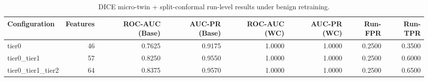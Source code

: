 \begin{table}[t]
\centering
\caption{DICE micro-twin + split-conformal run-level results under benign retraining.}
\label{tab:dice_full_overall}
\footnotesize
\begin{tabular}{lrrrrrrr}
\toprule
Configuration & Features & ROC-AUC (Base) & AUC-PR (Base) & ROC-AUC (WC) & AUC-PR (WC) & Run-FPR & Run-TPR \\
\midrule
tier0 & 46 & 0.7625 & 0.9175 & 1.0000 & 1.0000 & 0.2500 & 0.3500 \\
tier0_tier1 & 57 & 0.8250 & 0.9550 & 1.0000 & 1.0000 & 0.2500 & 0.6000 \\
tier0_tier1_tier2 & 64 & 0.8375 & 0.9570 & 1.0000 & 1.0000 & 0.2500 & 0.6500 \\
\bottomrule
\end{tabular}

\end{table}
